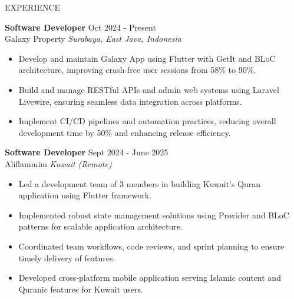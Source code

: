 \documentclass{resume} %
\begin{document}
\vspace{0.8em}
\begin{rSection}{EXPERIENCE}

\textbf{Software Developer} \hfill Oct 2024 - Present \\
Galaxy Property \hfill \textit{Surabaya, East Java, Indonesia}
\vspace{-0.75em}
\begin{itemize}
\itemsep -7pt {}
\item Develop and maintain Galaxy App using Flutter with GetIt and BLoC architecture, improving crash-free user sessions from 58\% to 90\%.
\item Build and manage RESTful APIs and admin web systems using Laravel Livewire, ensuring seamless data integration across platforms.
\item Implement CI/CD pipelines and automation practices, reducing overall development time by 50\% and enhancing release efficiency.
 \end{itemize}
 \vspace{-0.5em}

\textbf{Software Developer} \hfill Sept 2024 - June 2025 \\
Aliflammim \hfill \textit{Kuwait (Remote)}
\vspace{-0.75em}
\begin{itemize}
\itemsep -7pt {}
\item Led a development team of 3 members in building Kuwait's Quran application using Flutter framework.
\item Implemented robust state management solutions using Provider and BLoC patterns for scalable application architecture.
\item Coordinated team workflows, code reviews, and sprint planning to ensure timely delivery of features.
\item Developed cross-platform mobile application serving Islamic content and Quranic features for Kuwait users.
 \end{itemize}
 \vspace{-0.5em}


\end{rSection}
\end{document}
